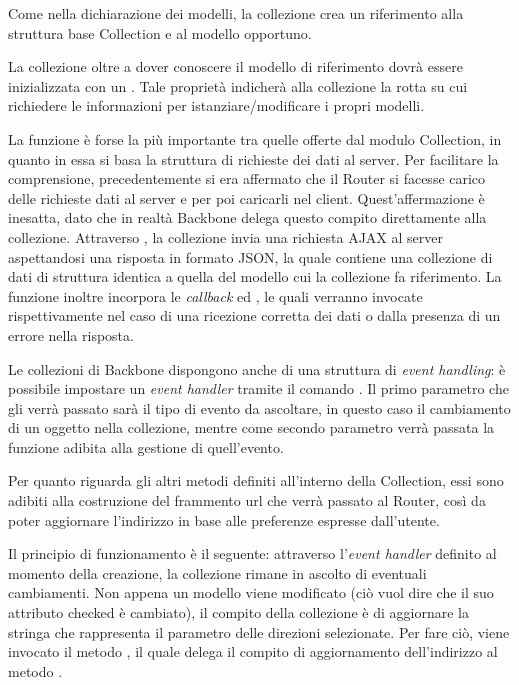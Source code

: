 Come nella dichiarazione dei modelli, la collezione crea un riferimento alla struttura base Collection e al modello opportuno.

La collezione oltre a dover conoscere il modello di riferimento dovrà essere inizializzata con un . Tale proprietà indicherà alla collezione la rotta su cui richiedere le informazioni per istanziare/modificare i propri modelli.

La funzione  è forse la più importante tra quelle offerte dal modulo Collection, in quanto in essa si basa la struttura di richieste dei dati al server. Per facilitare la comprensione, precedentemente si era affermato che il Router si facesse carico delle richieste dati al server e per poi caricarli nel client. Quest'affermazione è inesatta, dato che in realtà Backbone delega questo compito direttamente alla collezione. Attraverso , la collezione invia una richiesta AJAX al server aspettandosi una risposta in formato JSON, la quale contiene una collezione di dati di struttura identica a quella del modello cui la collezione fa riferimento.
La funzione  inoltre incorpora le {\itshape callback}  ed , le quali verranno invocate rispettivamente nel caso di una ricezione corretta dei dati o dalla presenza di un errore nella risposta.

Le collezioni di Backbone dispongono anche di una struttura di {\itshape event handling}: è possibile impostare un {\itshape event handler} tramite il comando . Il primo parametro che gli verrà passato sarà il tipo di evento da ascoltare, in questo caso il cambiamento di un oggetto nella collezione, mentre come secondo parametro verrà passata la funzione adibita alla gestione di quell'evento.

Per quanto riguarda gli altri metodi definiti all'interno della Collection, essi sono adibiti alla costruzione del frammento url che verrà passato al Router, così da poter aggiornare l'indirizzo in base alle preferenze espresse dall'utente.

Il principio di funzionamento è il seguente: attraverso l'{\itshape event handler} definito al momento della creazione, la collezione rimane in ascolto di eventuali cambiamenti. Non appena un modello viene modificato (ciò vuol dire che il suo attributo checked è cambiato), il compito della collezione è di aggiornare la stringa che rappresenta il parametro delle direzioni selezionate. Per fare ciò, viene invocato il metodo , il quale delega il compito di aggiornamento dell'indirizzo al metodo .

